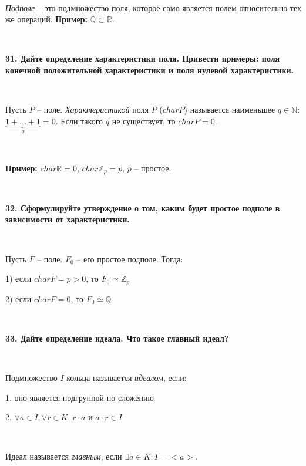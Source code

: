 \documentclass{article}
\begin{document}
	{
		$\;$
		\setlength{\parindent}{0.4cm}
		\hangindent=0.4cm
		
		\textit{Подполе} -- это подмножество поля, которое само является полем относительно тех же операций. \textbf{Пример:} $\mathbb{Q}\subset\mathbb{R}$.
		
		$\;$
		\setlength{\parindent}{0cm}
		\hangindent=0cm
	}
	
	\newpage
	
	\textbf{31. Дайте определение характеристики поля. Привести примеры: поля конечной положительной характеристики и поля нулевой характеристики.}
	
	{
		$\;$
		\setlength{\parindent}{0.4cm}
		\hangindent=0.4cm
		
		Пусть $P$ -- поле. \textit{Характеристикой} поля $P$ ($char P$) называется наименьшее $q\in\mathbb{N}:$ $\underbrace{1+\ldots+1}_{q}=0$. Если такого $q$ не существует, то $char P=0$.
		
		$\;$
		
		\textbf{Пример:} $char\mathbb{R}=0$, $char\mathbb{Z}_p=p$, $p$ -- простое.
		
		$\;$
		\setlength{\parindent}{0cm}
		\hangindent=0cm
	}
	
	\textbf{32. Сформулируйте утверждение о том, каким будет простое подполе в зависимости от характеристики.}
	
	{
		$\;$
		\setlength{\parindent}{0.4cm}
		\hangindent=0.4cm
		
		Пусть $F$ -- поле. $F_0$ -- его простое подполе. Тогда:
		
		1) если $char F=p>0$, то $F_0\simeq \mathbb{Z}_p$
		
		2) если $char F=0$, то $F_0\simeq\mathbb{Q}$
		
		$\;$
		\setlength{\parindent}{0cm}
		\hangindent=0cm
	}
	
	\textbf{33. Дайте определение идеала. Что такое главный идеал?}
	
	{
		$\;$
		\setlength{\parindent}{0.4cm}
		\hangindent=0.4cm
		
		Подмножество $I$ кольца называется \textit{идеалом}, если:
		
		1. оно является подгруппой по сложению
		
		2. $\forall a\in I, \forall r\in K\;\; r\cdot a$ и $a\cdot r\in I$
		
		$\;$
		
		Идеал называется \textit{главным}, если $\exists a\in K:I=<a>$.
		
		$\;$
		\setlength{\parindent}{0cm}
		\hangindent=0cm
	}
	
\end{document}
